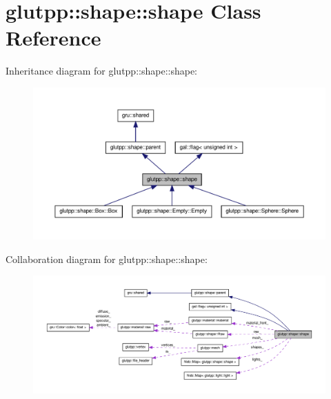 \hypertarget{classglutpp_1_1shape_1_1shape}{\section{glutpp\-:\-:shape\-:\-:shape \-Class \-Reference}
\label{classglutpp_1_1shape_1_1shape}
}


\-Inheritance diagram for glutpp\-:\-:shape\-:\-:shape\-:\nopagebreak
\begin{figure}[H]
\begin{center}
\leavevmode
\includegraphics[width=350pt]{classglutpp_1_1shape_1_1shape__inherit__graph}
\end{center}
\end{figure}


\-Collaboration diagram for glutpp\-:\-:shape\-:\-:shape\-:\nopagebreak
\begin{figure}[H]
\begin{center}
\leavevmode
\includegraphics[width=350pt]{classglutpp_1_1shape_1_1shape__coll__graph}
\end{center}
\end{figure}
